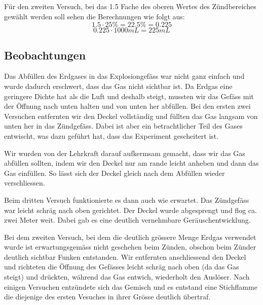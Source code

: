 \documentclass[11pt,paper=a4,final]{scrartcl}
\begin{document}
F\"ur den zweiten Versuch, bei das 1.5 Fache des oberen Wertes des
Z\"undbereiches gew\"ahlt werden soll sehen die Berechnungen wie folgt aus:
\[ 1.5 \cdot 25\% = 22.5\% = 0.225 \]
\[ 0.225 \cdot 1000mL = 225mL \]
\subsection{Beobachtungen}
Das Abf\"ullen des Erdgases in das Explosiongef\"ass war nicht ganz einfach und
wurde dadurch erschwert, dass das Gas nicht sichtbar ist. Da Erdgas eine
geringere Dichte hat als die Luft und deshalb steigt, mussten wir das Gef\"ass
mit der \"Offnung nach unten halten und von unten her abf\"ullen. Bei den ersten
zwei Versuchen entfernten wir den Deckel vollst\"andig und f\"ullten das Gas
langsam von unten her in das Z\"undgef\"ass. Dabei ist aber ein betrachtlicher
Teil des Gases entwischt, was dazu gef\"uhrt hat, dass das Experiment
gescheitert ist.

Wir wurden von der Lehrkraft darauf aufkermsam gemacht, dass wir das Gas
abf\"ullen sollten, indem wir den Deckel nur am rande leicht anheben und dann
das Gas einf\"ullen. So l\"asst sich der Deckel gleich nach dem Abf\"ullen
wieder verschliessen.

Beim dritten Versuch funktionierte es dann auch wie erwartet. Das Z\"undgef\"ass
war leicht schr\"ag nach oben gerichtet. Der Deckel wurde \glqq abgesprengt\grqq
und flog ca. zwei Meter weit. Dabei gab es eine deutlich vernehmbare
Ger\"auschentwicklung.

Bei dem zweiten Versuch, bei dem die deutlich gr\"ossere Menge Erdgas verwendet
wurde ist erwartungsgem\"ass nicht geschehen beim Z\"unden, obschon beim
Z\"under deutlich sichtbar Funken entstanden. Wir entfernten anschliessend den
Deckel und richteten die \"Offnung des Gef\"asses leicht schr\"ag nach oben (da
das Gas steigt) und dr\"uckten, w\"ahrend das Gas entwich, wiederholt den
Ausl\"oser. Nach einigen Versuchen entz\"undete sich das Gemisch und es entstand
eine Stichflamme die diejenige des ersten Vesuches in ihrer Gr\"osse deutlich
\"ubertraf.
\end{document}
